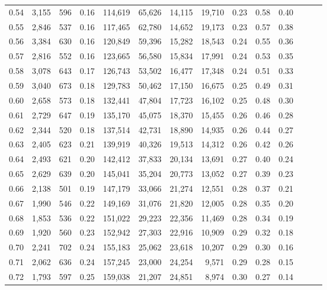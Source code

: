 \begin{tabular}{rrrrrrrrrrrrrr}
0.54 &  3,155 &  596 &  0.16 &  114,619 &   65,626 &  14,115 &  19,710 &  0.23 &  0.58 &      0.40 \\
0.55 &  2,846 &  537 &  0.16 &  117,465 &   62,780 &  14,652 &  19,173 &  0.23 &  0.57 &      0.38 \\
0.56 &  3,384 &  630 &  0.16 &  120,849 &   59,396 &  15,282 &  18,543 &  0.24 &  0.55 &      0.36 \\
0.57 &  2,816 &  552 &  0.16 &  123,665 &   56,580 &  15,834 &  17,991 &  0.24 &  0.53 &      0.35 \\
0.58 &  3,078 &  643 &  0.17 &  126,743 &   53,502 &  16,477 &  17,348 &  0.24 &  0.51 &      0.33 \\
0.59 &  3,040 &  673 &  0.18 &  129,783 &   50,462 &  17,150 &  16,675 &  0.25 &  0.49 &      0.31 \\
0.60 &  2,658 &  573 &  0.18 &  132,441 &   47,804 &  17,723 &  16,102 &  0.25 &  0.48 &      0.30 \\
0.61 &  2,729 &  647 &  0.19 &  135,170 &   45,075 &  18,370 &  15,455 &  0.26 &  0.46 &      0.28 \\
0.62 &  2,344 &  520 &  0.18 &  137,514 &   42,731 &  18,890 &  14,935 &  0.26 &  0.44 &      0.27 \\
0.63 &  2,405 &  623 &  0.21 &  139,919 &   40,326 &  19,513 &  14,312 &  0.26 &  0.42 &      0.26 \\
0.64 &  2,493 &  621 &  0.20 &  142,412 &   37,833 &  20,134 &  13,691 &  0.27 &  0.40 &      0.24 \\
0.65 &  2,629 &  639 &  0.20 &  145,041 &   35,204 &  20,773 &  13,052 &  0.27 &  0.39 &      0.23 \\
0.66 &  2,138 &  501 &  0.19 &  147,179 &   33,066 &  21,274 &  12,551 &  0.28 &  0.37 &      0.21 \\
0.67 &  1,990 &  546 &  0.22 &  149,169 &   31,076 &  21,820 &  12,005 &  0.28 &  0.35 &      0.20 \\
0.68 &  1,853 &  536 &  0.22 &  151,022 &   29,223 &  22,356 &  11,469 &  0.28 &  0.34 &      0.19 \\
0.69 &  1,920 &  560 &  0.23 &  152,942 &   27,303 &  22,916 &  10,909 &  0.29 &  0.32 &      0.18 \\
0.70 &  2,241 &  702 &  0.24 &  155,183 &   25,062 &  23,618 &  10,207 &  0.29 &  0.30 &      0.16 \\
0.71 &  2,062 &  636 &  0.24 &  157,245 &   23,000 &  24,254 &   9,571 &  0.29 &  0.28 &      0.15 \\
0.72 &  1,793 &  597 &  0.25 &  159,038 &   21,207 &  24,851 &   8,974 &  0.30 &  0.27 &      0.14 \\

\end{tabular}
